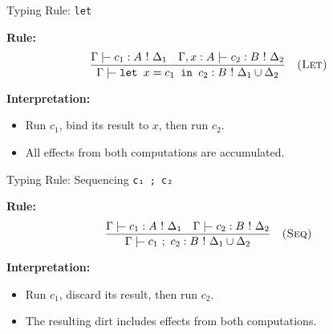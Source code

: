 \begin{frame}{Typing Rule: \texttt{let}}

\textbf{Rule:}
\[
\frac{
  \Gamma \tvdash c_1 : A\ !\ \Delta_1
  \quad
  \Gamma, x : A \tvdash c_2 : B\ !\ \Delta_2
}{
  \Gamma \tvdash \texttt{let } x = c_1 \texttt{ in } c_2 : B\ !\ \Delta_1 \cup \Delta_2
}
\quad\textsc{(Let)}
\]

\vspace{1em}
\textbf{Interpretation:}
\begin{itemize}
  \item Run \( c_1 \), bind its result to \( x \), then run \( c_2 \).
  \item All effects from both computations are accumulated.
\end{itemize}

\end{frame}

\begin{frame}{Typing Rule: Sequencing \texttt{c₁ ; c₂}}

\textbf{Rule:}
\[
\frac{
  \Gamma \tvdash c_1 : A\ !\ \Delta_1
  \quad
  \Gamma \tvdash c_2 : B\ !\ \Delta_2
}{
  \Gamma \tvdash c_1\ ;\ c_2 : B\ !\ \Delta_1 \cup \Delta_2
}
\quad\textsc{(Seq)}
\]

\vspace{1em}
\textbf{Interpretation:}
\begin{itemize}
  \item Run \( c_1 \), discard its result, then run \( c_2 \).
  \item The resulting dirt includes effects from both computations.
\end{itemize}

\end{frame}

